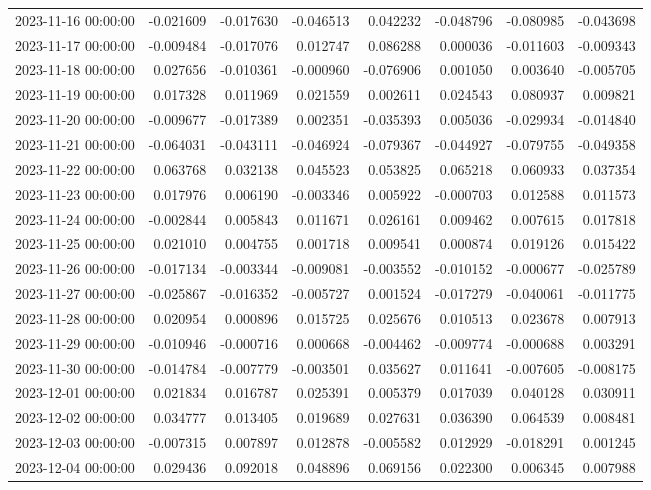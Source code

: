 \begin{tabular}{lrrrrrrr}
2023-11-16 00:00:00 & -0.021609 & -0.017630 & -0.046513 & 0.042232 & -0.048796 & -0.080985 & -0.043698 \\
2023-11-17 00:00:00 & -0.009484 & -0.017076 & 0.012747 & 0.086288 & 0.000036 & -0.011603 & -0.009343 \\
2023-11-18 00:00:00 & 0.027656 & -0.010361 & -0.000960 & -0.076906 & 0.001050 & 0.003640 & -0.005705 \\
2023-11-19 00:00:00 & 0.017328 & 0.011969 & 0.021559 & 0.002611 & 0.024543 & 0.080937 & 0.009821 \\
2023-11-20 00:00:00 & -0.009677 & -0.017389 & 0.002351 & -0.035393 & 0.005036 & -0.029934 & -0.014840 \\
2023-11-21 00:00:00 & -0.064031 & -0.043111 & -0.046924 & -0.079367 & -0.044927 & -0.079755 & -0.049358 \\
2023-11-22 00:00:00 & 0.063768 & 0.032138 & 0.045523 & 0.053825 & 0.065218 & 0.060933 & 0.037354 \\
2023-11-23 00:00:00 & 0.017976 & 0.006190 & -0.003346 & 0.005922 & -0.000703 & 0.012588 & 0.011573 \\
2023-11-24 00:00:00 & -0.002844 & 0.005843 & 0.011671 & 0.026161 & 0.009462 & 0.007615 & 0.017818 \\
2023-11-25 00:00:00 & 0.021010 & 0.004755 & 0.001718 & 0.009541 & 0.000874 & 0.019126 & 0.015422 \\
2023-11-26 00:00:00 & -0.017134 & -0.003344 & -0.009081 & -0.003552 & -0.010152 & -0.000677 & -0.025789 \\
2023-11-27 00:00:00 & -0.025867 & -0.016352 & -0.005727 & 0.001524 & -0.017279 & -0.040061 & -0.011775 \\
2023-11-28 00:00:00 & 0.020954 & 0.000896 & 0.015725 & 0.025676 & 0.010513 & 0.023678 & 0.007913 \\
2023-11-29 00:00:00 & -0.010946 & -0.000716 & 0.000668 & -0.004462 & -0.009774 & -0.000688 & 0.003291 \\
2023-11-30 00:00:00 & -0.014784 & -0.007779 & -0.003501 & 0.035627 & 0.011641 & -0.007605 & -0.008175 \\
2023-12-01 00:00:00 & 0.021834 & 0.016787 & 0.025391 & 0.005379 & 0.017039 & 0.040128 & 0.030911 \\
2023-12-02 00:00:00 & 0.034777 & 0.013405 & 0.019689 & 0.027631 & 0.036390 & 0.064539 & 0.008481 \\
2023-12-03 00:00:00 & -0.007315 & 0.007897 & 0.012878 & -0.005582 & 0.012929 & -0.018291 & 0.001245 \\
2023-12-04 00:00:00 & 0.029436 & 0.092018 & 0.048896 & 0.069156 & 0.022300 & 0.006345 & 0.007988 \\

\end{tabular}
